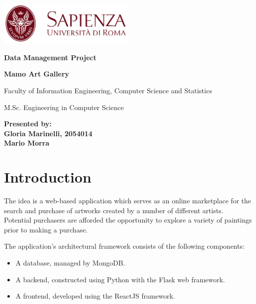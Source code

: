 \documentclass[a4paper,12pt]{article}
\begin{document}
\begin{titlepage}
    \begingroup
    \centering
    \includegraphics[width=0.5\textwidth]{sapienza.png}\par\vspace{1cm}

    {\bfseries\large Data Management Project \par}\vspace{0.5cm}

    {\bfseries\LARGE Mamo Art Gallery \par}\vspace{1cm}

    {\small Faculty of Information Engineering, Computer Science and Statistics
        \par}\vspace{0.1cm}

    {\small
        M.Sc. Engineering in Computer Science
        \par}\vspace{10cm}

    \endgroup

    {\textbf{\small
            Presented by: \\
            Gloria Marinelli, 2054014 \\
            Mario Morra}}\vfill

\end{titlepage}

\tableofcontents
\newpage

\section{Introduction}
\justify
The idea is a web-based application which serves as an online marketplace for the search and purchase of artworks created by a number of different artists. Potential purchasers are afforded the opportunity to explore a variety of paintings prior to making a purchase.

The application's architectural framework consists of the following components:

\begin{itemize}
    \item A database, managed by MongoDB.
    \item A backend, constructed using Python with the Flask web framework.
    \item A frontend, developed using the ReactJS framework.
\end{itemize}
\end{document}
